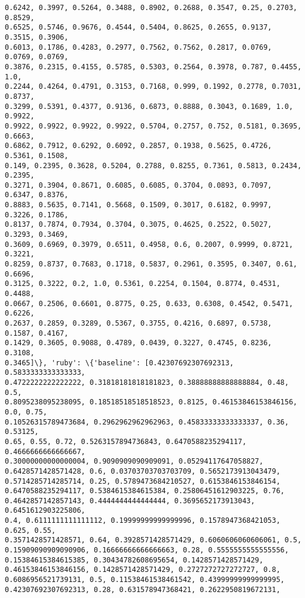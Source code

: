 \documentclass[11pt]{article}
\begin{document}
\begin{Verbatim}[commandchars=\\\{\}]
0.6242, 0.3997, 0.5264, 0.3488, 0.8902, 0.2688, 0.3547, 0.25, 0.2703, 0.8529,
0.6525, 0.5746, 0.9676, 0.4544, 0.5404, 0.8625, 0.2655, 0.9137, 0.3515, 0.3906,
0.6013, 0.1786, 0.4283, 0.2977, 0.7562, 0.7562, 0.2817, 0.0769, 0.0769, 0.0769,
0.3876, 0.2315, 0.4155, 0.5785, 0.5303, 0.2564, 0.3978, 0.787, 0.4455, 1.0,
0.2244, 0.4264, 0.4791, 0.3153, 0.7168, 0.999, 0.1992, 0.2778, 0.7031, 0.8737,
0.3299, 0.5391, 0.4377, 0.9136, 0.6873, 0.8888, 0.3043, 0.1689, 1.0, 0.9922,
0.9922, 0.9922, 0.9922, 0.9922, 0.5704, 0.2757, 0.752, 0.5181, 0.3695, 0.6663,
0.6862, 0.7912, 0.6292, 0.6092, 0.2857, 0.1938, 0.5625, 0.4726, 0.5361, 0.1508,
0.149, 0.2395, 0.3628, 0.5204, 0.2788, 0.8255, 0.7361, 0.5813, 0.2434, 0.2395,
0.3271, 0.3904, 0.8671, 0.6085, 0.6085, 0.3704, 0.0893, 0.7097, 0.6347, 0.8376,
0.8883, 0.5635, 0.7141, 0.5668, 0.1509, 0.3017, 0.6182, 0.9997, 0.3226, 0.1786,
0.8137, 0.7874, 0.7934, 0.3704, 0.3075, 0.4625, 0.2522, 0.5027, 0.3293, 0.3469,
0.3609, 0.6969, 0.3979, 0.6511, 0.4958, 0.6, 0.2007, 0.9999, 0.8721, 0.3221,
0.8259, 0.8737, 0.7683, 0.1718, 0.5837, 0.2961, 0.3595, 0.3407, 0.61, 0.6696,
0.3125, 0.3222, 0.2, 1.0, 0.5361, 0.2254, 0.1504, 0.8774, 0.4531, 0.4488,
0.0667, 0.2506, 0.6601, 0.8775, 0.25, 0.633, 0.6308, 0.4542, 0.5471, 0.6226,
0.2637, 0.2859, 0.3289, 0.5367, 0.3755, 0.4216, 0.6897, 0.5738, 0.1587, 0.4167,
0.1429, 0.3605, 0.9088, 0.4789, 0.0439, 0.3227, 0.4745, 0.8236, 0.3108,
0.3465]\}, 'ruby': \{'baseline': [0.42307692307692313, 0.5833333333333333,
0.4722222222222222, 0.31818181818181823, 0.38888888888888884, 0.48, 0.5,
0.8095238095238095, 0.18518518518518523, 0.8125, 0.46153846153846156, 0.0, 0.75,
0.10526315789473684, 0.2962962962962963, 0.45833333333333337, 0.36, 0.53125,
0.65, 0.55, 0.72, 0.5263157894736843, 0.6470588235294117, 0.4666666666666667,
0.30000000000000004, 0.9090909090909091, 0.05294117647058827,
0.6428571428571428, 0.6, 0.03703703703703709, 0.5652173913043479,
0.5714285714285714, 0.25, 0.5789473684210527, 0.6153846153846154,
0.6470588235294117, 0.5384615384615384, 0.25806451612903225, 0.76,
0.4642857142857143, 0.4444444444444444, 0.3695652173913043, 0.6451612903225806,
0.4, 0.6111111111111112, 0.19999999999999996, 0.1578947368421053, 0.625, 0.55,
0.3571428571428571, 0.64, 0.3928571428571429, 0.6060606060606061, 0.5,
0.15909090909090906, 0.16666666666666663, 0.28, 0.5555555555555556,
0.15384615384615385, 0.30434782608695654, 0.1428571428571429,
0.46153846153846156, 0.1428571428571429, 0.2727272727272727, 0.8,
0.6086956521739131, 0.5, 0.11538461538461542, 0.43999999999999995,
0.42307692307692313, 0.28, 0.631578947368421, 0.2622950819672131,

\end{Verbatim}
\end{document}
